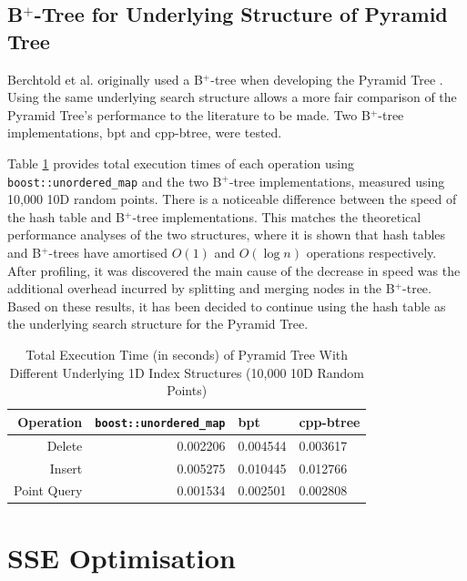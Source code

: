 \subsection{B${}^+$-Tree for Underlying Structure of Pyramid Tree}

Berchtold et al. originally used a B${}^{+}$-tree when developing the Pyramid Tree \cite{pyramid-tree}. Using the same underlying search structure allows a more fair comparison of the Pyramid Tree's performance to the literature to be made. Two B${}^{+}$-tree implementations, bpt\cite{bpt} and cpp-btree\cite{cpp-btree}, were tested.

Table \ref{tab:hashtable-bplus-time-comparison} provides total execution times of each operation using \texttt{boost::unordered\_map} and the two B${}^{+}$-tree implementations, measured using 10,000 10D random points. There is a noticeable difference between the speed of the hash table and B${}^{+}$-tree implementations. This matches the theoretical performance analyses of the two structures, where it is shown that hash tables and B${}^{+}$-trees have amortised $O(1)$ and $O(\log n)$ operations respectively. After profiling, it was discovered the main cause of the decrease in speed was the additional overhead incurred by splitting and merging nodes in the B${}^{+}$-tree. Based on these results, it has been decided to continue using the hash table as the underlying search structure for the Pyramid Tree.

\begin{table}
	\centering
	\begin{tabular}{|r|r|l|l|}
		\hline
		\textbf{Operation} & \texttt{boost::unordered\_map} & bpt & cpp-btree  \\
		\hline
		Delete & 0.002206 & 0.004544 & 0.003617 \\
		Insert & 0.005275 & 0.010445 & 0.012766 \\
		Point Query & 0.001534 & 0.002501 & 0.002808 \\
		\hline
	\end{tabular}
	\caption{Total Execution Time (in seconds) of Pyramid Tree With Different Underlying 1D Index Structures (10,000 10D Random Points)}
	\label{tab:hashtable-bplus-time-comparison}
\end{table}

\section{SSE Optimisation}

